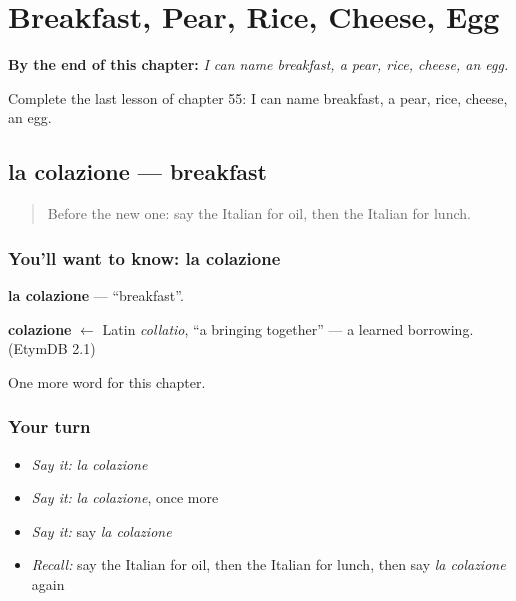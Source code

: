 
\chapter{Breakfast, Pear, Rice, Cheese, Egg}
\label{ch:it-breakfast-pear-rice-cheese-egg}

\begin{chapteropening}
\textbf{By the end of this chapter:} \emph{I can name breakfast, a pear, rice, cheese, an egg.}

Complete the last lesson of chapter 55: I can name breakfast, a pear, rice, cheese, an egg.
\end{chapteropening}

\section[la colazione]{la colazione — breakfast}

\label{lesson:IT-C55-colazione}



\begin{quote}
Before the new one: say the Italian for oil, then the Italian for lunch.
\end{quote}

\subsection*{You'll want to know: la colazione}
\textbf{la colazione} — \textquotedblleft{}breakfast\textquotedblright{}.

\begin{cousinweb}
\textbf{colazione} $\leftarrow$ Latin \emph{collatio}, \textquotedblleft{}a bringing together\textquotedblright{} — a learned borrowing. (EtymDB 2.1)
\end{cousinweb}

\begin{grammarlens}[title={What you've built}]
One more word for this chapter.
\end{grammarlens}

\subsection*{Your turn}
\begin{itemize}
\raggedright
  \item \emph{Say it:} \emph{la colazione}
  \item \emph{Say it:} \emph{la colazione}, once more
  \item \emph{Say it:} say \emph{la colazione}
  \item \emph{Recall:} say the Italian for oil, then the Italian for lunch, then say \emph{la colazione} again
\end{itemize}

